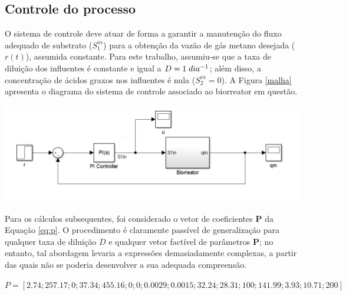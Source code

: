 \documentclass[a0,portrait]{a0poster}
\makeatletter
\newcommand{\eqnum}{\refstepcounter{equation}\textup{\tagform@{\theequation}}}
\makeatother
\begin{document}
\begin{multicols}{2}

\section*{Controle do processo}
\quad O sistema de controle deve atuar de forma a garantir a manutenção do fluxo adequado de substrato ($S_1^{in}$) para a obtenção da vazão de gás metano desejada ($r(t)$), assumida constante. Para este trabalho, assumiu-se que a taxa de diluição dos influentes é constante e igual a $D = 1 \hspace{1mm} dia^{-1}$; além disso, a concentração de ácidos graxos nos influentes é nula ($S_2^{in} = 0$). A Figura \ref{malha} apresenta o diagrama do sistema de controle associado ao biorreator em questão.  
\begin{minipage}{.5\textwidth}
\begin{center}
\includegraphics[width=0.7\linewidth]{malha.png}
 \label{malha}
\end{center}
\end{minipage}

\quad Para os cálculos subsequentes, foi considerado o vetor de coeficientes \textbf{P} da Equação \ref{eq:p}. O procedimento é claramente passível de generalização para qualquer taxa de diluição $D$ e qualquer vetor factível de parâmetros  \textbf{P}; no entanto, tal abordagem levaria a expressões demasiadamente complexas, a partir das quais não se poderia desenvolver a sua adequada compreensão.
\vspace{1mm}
\begin{tcolorbox}	
							
$P = [ 2.74   ;   
      257.17  ;    
      0          ;           
      37.34     ; 
      455.16     ; 
      0           ; 
      0           ;  
      0.0029      ;  
      0.0015      ;  
      32.24     ;  
      28.31     ;  
      100         ;  
      141.99    ; 
      3.93     ;  
      10.71     ;  
      200       ] $  \hspace{4mm}	\eqnum\label{eq:p}
   

\end{tcolorbox}
\end{multicols}
\end{document}
